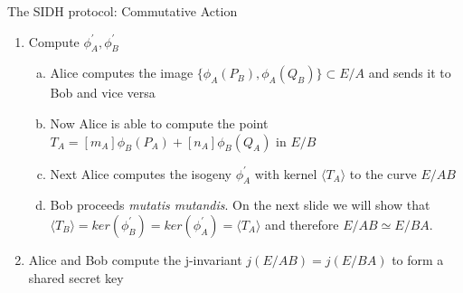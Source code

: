 \documentclass[handout]{beamer}
\begin{document}
\begin{frame}{The SIDH protocol: Commutative Action}

\begin{enumerate}[1.]
	\item Compute $\phi_A^{\prime},\phi_B^{\prime}$

	\begin{enumerate}[(a)]
		\item Alice computes the image $\{\phi_A(P_B),\phi_A(Q_B)\} \subset E/A$ and sends it to Bob and vice versa\pause
		\item Now Alice is able to compute the point $T_A=[m_A]\phi_B(P_A) + [n_A]\phi_B(Q_A)$ in $E/B$\pause
		\item Next Alice computes the isogeny $\phi_A^{\prime}$ with kernel $\langle T_A \rangle$ to the curve $E/AB$\pause
		\item Bob proceeds \textit{mutatis mutandis}. On the next slide we will show that $\langle T_B \rangle  = ker(\phi_B^{\prime})=ker(\phi_A^{\prime})=\langle T_A \rangle$ and therefore $E/AB \simeq E/BA$.
	\end{enumerate}
	\item Alice and Bob compute the j-invariant $j(E/AB)=j(E/BA)$ to form a shared secret key 
\end{enumerate}
\end{frame}

%
%
%
%
\end{document}

